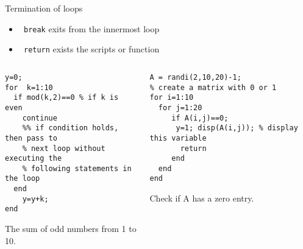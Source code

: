 \documentclass[aspectratio=169]{beamer}
\begin{document}
 \begin{frame}[containsverbatim]{Termination of loops}
   \begin{itemize}
     \item  {\tt\color{red} break} exits from the innermost loop
     \item  {\tt\color{red} return}  exists  the scripts or function
   \end{itemize}
   \begin{columns}
     \begin{column}{0.5\linewidth}    
\begin{lstlisting}
y=0;
for  k=1:10
  if mod(k,2)==0 % if k is even 
    continue
    %% if condition holds, then pass to
    % next loop without executing the
    % following statements in the loop 
  end
    y=y+k;
end
\end{lstlisting}
     The sum of odd numbers from 1 to 10.
   \end{column}
   \begin{column}{0.5\linewidth}
\begin{lstlisting}
A = randi(2,10,20)-1;
% create a matrix with 0 or 1
for i=1:10
  for j=1:20
     if A(i,j)==0;
      y=1; disp(A(i,j)); % display this variable
       return
     end
  end
end
\end{lstlisting}
     Check if A has a zero entry.
   \end{column}
   \end{columns}
 \end{frame}
 
\end{document}
